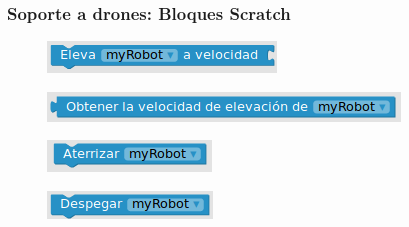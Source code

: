 \documentclass[xcolor={table}]{beamer}
\begin{document}
		\begin{frame}
		\frametitle{Soporte a drones: Bloques Scratch}
		       \begin{figure}[H]
            \centering
            \includegraphics[scale=0.5]{img/ascensionBlockly.png}
           \label{fig:ascension}
            \end{figure}
                 \begin{figure}[H]
            \centering
            \includegraphics[scale=0.5]{img/verticalBlockly.png}
           \label{fig:vertica}
            \end{figure}
            \begin{figure}[H]
            \centering
            \includegraphics[scale=0.5]{img/aterrizarBlockly.png}
           \label{fig:vertica}
            \end{figure}
               \begin{figure}[H]
            \centering
            \includegraphics[scale=0.5]{img/despegarBlockly.png}
           \label{fig:vertica}
            \end{figure}
		\end{frame}
		
		
		
\end{document}
